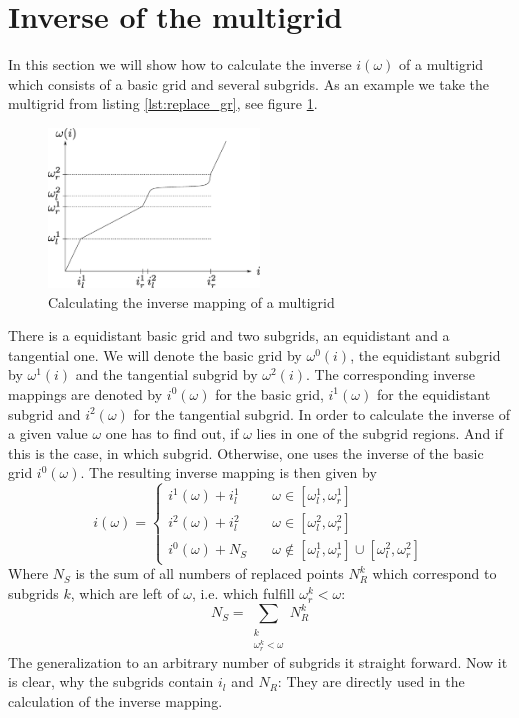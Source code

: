 \section{Inverse of the multigrid}\label{sec:inverse_of_the_multigrid}
In this section we will show how to calculate the inverse $i(\omega)$ of a multigrid which consists of a basic grid and several subgrids. As an example we take the multigrid from listing \ref{lst:replace_gr}, see figure \ref{fig:inverse}.

\begin{figure}[h]
	\centering
	\includegraphics[width=0.5\textwidth]{pics/inverse.eps}
	\caption{Calculating the inverse mapping of a multigrid}
	\label{fig:inverse}
\end{figure}

There is a equidistant basic grid and two subgrids, an equidistant and a tangential one. We will denote the basic grid by $\omega^0(i)$, the equidistant subgrid by $\omega^1(i)$ and the tangential subgrid by $\omega^2(i)$. The corresponding inverse mappings are denoted by $i^0(\omega)$ for the basic grid, $i^1(\omega)$ for the equidistant subgrid and $i^2(\omega)$ for the tangential subgrid. In order to calculate the inverse of a given value $\omega$ one has to find out, if $\omega$ lies in one of the subgrid regions. And if this is the case, in which subgrid. Otherwise, one uses the inverse of the basic grid $i^0(\omega)$. The resulting inverse mapping is then given by
\begin{equation}\label{eqn:inverse}
	i(\omega)=\begin{cases}
			i^1(\omega) + i_l^1 \quad & \omega \in [\omega_l^1, \omega_r^1]\\
			i^2(\omega) + i_l^2 \quad & \omega \in [\omega_l^2, \omega_r^2]\\
			i^0(\omega) + N_S \quad & \omega \notin [\omega_l^1, \omega_r^1] \cup [\omega_l^2, \omega_r^2]
	          \end{cases}
\end{equation}
Where $N_S$ is the sum of all numbers of replaced points $N_R^k$ which correspond to subgrids $k$, which are left of $\omega$, i.e. which fulfill $\omega_r^k<\omega$:
\[
	N_S=\sum_{\substack{k\\ \omega_r^k<\omega}} N_R^k
\]
The generalization to an arbitrary number of subgrids it straight forward. Now it is clear, why the subgrids contain $i_l$ and $N_R$: They are directly used in the calculation of the inverse mapping.

